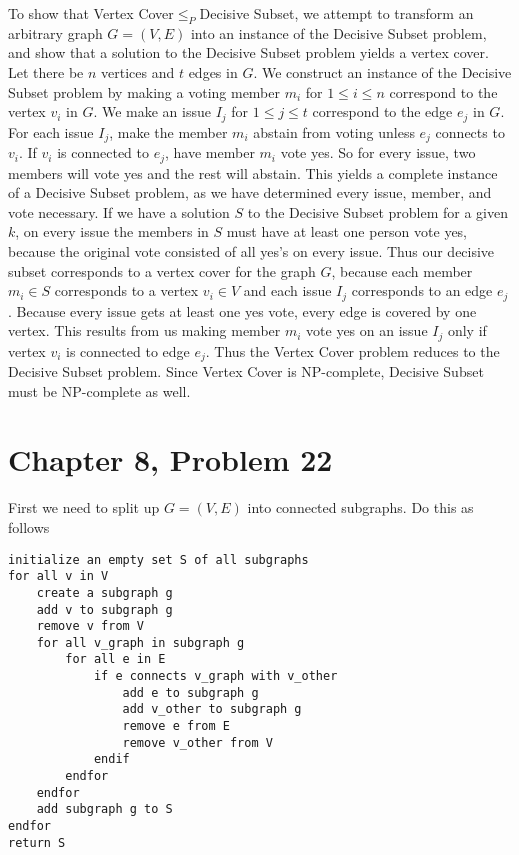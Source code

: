 \documentclass[12pt]{article}
\begin{document}
To show that Vertex Cover\(\leq_P\)Decisive Subset, we attempt to transform an arbitrary graph \(G=(V,E)\) into an instance of the
Decisive Subset problem, and show that a solution to the Decisive Subset problem yields a vertex cover. Let there be \(n\) vertices
and \(t\) edges in \(G\). We construct an instance of the Decisive Subset problem by making a voting member \(m_i\) for
\(1\leq i\leq n\) correspond to the vertex \(v_i\) in \(G\). We make an issue \(I_j\) for \(1\leq j\leq t\) correspond to the
edge \(e_j\) in \(G\). For each issue \(I_j\), make the member \(m_i\) abstain from voting unless \(e_j\) connects to \(v_i\). If
\(v_i\) is connected to \(e_j\), have member \(m_i\) vote yes. So for every issue, two members will vote yes and the rest will abstain.
This yields a complete instance of a Decisive Subset problem, as we have determined every issue, member, and vote necessary. If we have a
solution \(S\) to the Decisive Subset problem for a given \(k\), on every issue the members in \(S\) must have at least one person vote yes,
because the original vote consisted of all yes's on every issue. Thus our decisive subset corresponds to a vertex cover for
the graph \(G\), because each member \(m_i\in S\) corresponds to a vertex \(v_i\in V\) and each issue \(I_j\) corresponds to an edge \(e_j\).
Because every issue gets at least one yes vote, every edge is covered by one vertex. This results from us making member \(m_i\) vote yes on an
issue \(I_j\) only if vertex \(v_i\) is connected to edge \(e_j\). Thus the Vertex Cover problem reduces to the Decisive Subset problem. Since
Vertex Cover is NP-complete, Decisive Subset must be NP-complete as well.

\pagebreak

\section*{Chapter 8, Problem 22}

First we need to split up \(G=(V,E)\) into connected subgraphs. Do this as follows

\begin{verbatim}
initialize an empty set S of all subgraphs
for all v in V
    create a subgraph g
    add v to subgraph g
    remove v from V
    for all v_graph in subgraph g
        for all e in E
            if e connects v_graph with v_other
                add e to subgraph g
                add v_other to subgraph g
                remove e from E
                remove v_other from V
            endif
        endfor
    endfor
    add subgraph g to S
endfor
return S
\end{verbatim}
\end{document}
